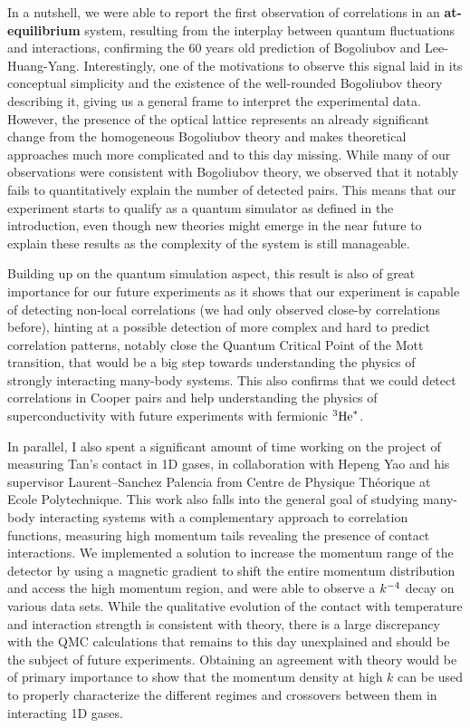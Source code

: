 In a nutshell, we were able to report the first observation of \kmk correlations in an \textbf{at-equilibrium} system, resulting from the interplay between quantum fluctuations and interactions, confirming the 60 years old prediction of Bogoliubov and Lee-Huang-Yang. Interestingly, one of the motivations to observe this signal laid in its conceptual simplicity and the existence of the well-rounded Bogoliubov theory describing it, giving us a general frame to interpret the experimental data. However, the presence of the optical lattice represents an already significant change from the homogeneous Bogoliubov theory and makes theoretical approaches much more complicated and to this day missing. While many of our observations were consistent with Bogoliubov theory, we observed that it notably fails to quantitatively explain the number of detected pairs. This means that our experiment starts to qualify as a quantum simulator as defined in the introduction, even though new theories might emerge in the near future to explain these results as the complexity of the system is still manageable. 

Building up on the quantum simulation aspect, this result is also of great importance for our future experiments as it shows that our experiment is capable of detecting non-local \kmk correlations (we had only observed close-by \kk correlations before), hinting at a possible detection of more complex and hard to predict correlation patterns, notably close the Quantum Critical Point of the Mott transition, that would be a big step towards understanding the physics of strongly interacting many-body systems. This also confirms that we could detect \kmk correlations in Cooper pairs and help understanding the physics of superconductivity with future experiments with fermionic $^3 \rm{He}^*$.

In parallel, I also spent a significant amount of time working on the project of measuring Tan's contact in 1D gases, in collaboration with Hepeng Yao and his supervisor Laurent--Sanchez Palencia from Centre de Physique Théorique at Ecole Polytechnique. This work also falls into the general goal of studying many-body interacting systems with a complementary approach to correlation functions, \ie measuring high momentum tails revealing the presence of contact interactions. We implemented a solution to increase the momentum range of the detector by using a magnetic gradient to shift the entire momentum distribution and access the high momentum region, and were able to observe a $k^{-4}$ decay on various data sets. While the qualitative evolution of the contact with temperature and interaction strength is consistent with theory, there is a large discrepancy with the QMC calculations that remains to this day unexplained and should be the subject of future experiments. Obtaining an agreement with theory would be of primary importance to show that the momentum density at high $k$ can be used to properly characterize the different regimes and crossovers between them in interacting 1D gases.

